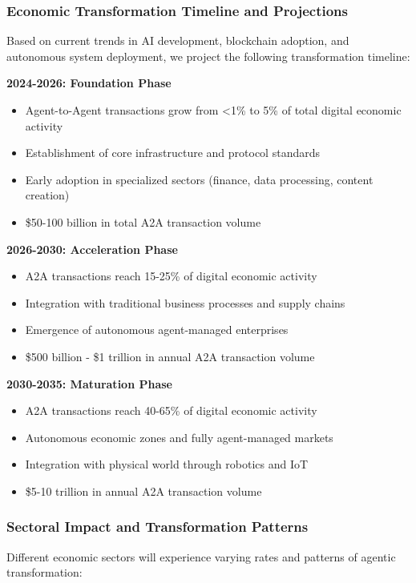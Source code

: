 \documentclass[12pt,a4paper]{article}
\begin{document}
\subsubsection{Economic Transformation Timeline and Projections}

Based on current trends in AI development, blockchain adoption, and autonomous system deployment, we project the following transformation timeline:

\textbf{2024-2026: Foundation Phase}
\begin{itemize}
\item Agent-to-Agent transactions grow from <1\% to 5\% of total digital economic activity
\item Establishment of core infrastructure and protocol standards
\item Early adoption in specialized sectors (finance, data processing, content creation)
\item \$50-100 billion in total A2A transaction volume
\end{itemize}

\textbf{2026-2030: Acceleration Phase}
\begin{itemize}
\item A2A transactions reach 15-25\% of digital economic activity
\item Integration with traditional business processes and supply chains
\item Emergence of autonomous agent-managed enterprises
\item \$500 billion - \$1 trillion in annual A2A transaction volume
\end{itemize}

\textbf{2030-2035: Maturation Phase}
\begin{itemize}
\item A2A transactions reach 40-65\% of digital economic activity
\item Autonomous economic zones and fully agent-managed markets
\item Integration with physical world through robotics and IoT
\item \$5-10 trillion in annual A2A transaction volume
\end{itemize}

\subsubsection{Sectoral Impact and Transformation Patterns}

Different economic sectors will experience varying rates and patterns of agentic transformation:
\end{document}
